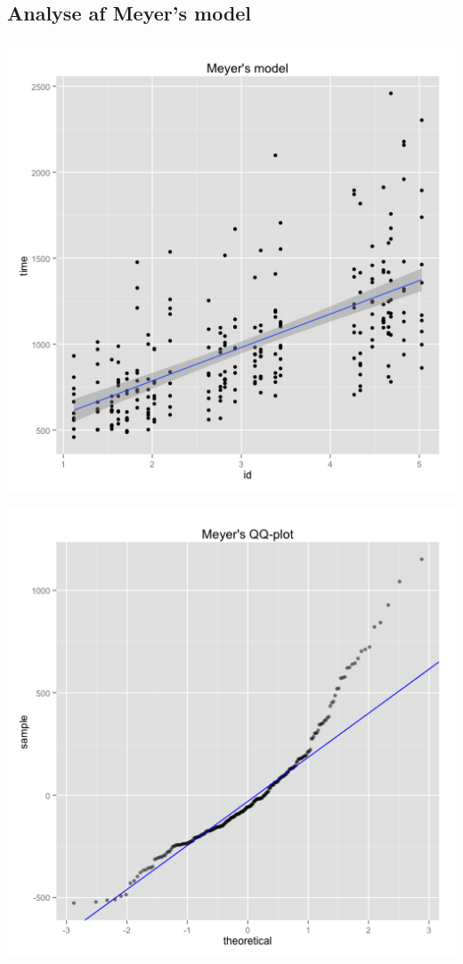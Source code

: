 \subsection*{Analyse af Meyer's model}
\begin{minipage}{.5\textwidth}
	\centering
	\includegraphics[width=\textwidth]{images/plots/plot_model_meyer}
	\label{fig:plot_model_meyer}
\end{minipage}
\begin{minipage}{.5\textwidth}
	\centering
	\includegraphics[width=\textwidth]{images/plots/plot_qq_meyer}
	\label{fig:plot_qq_meyer}
\end{minipage}


